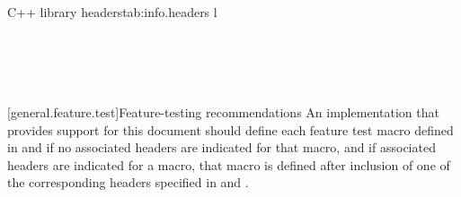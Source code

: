

\begin{floattable}{C++ library headers}{tab:info.headers}
{l}
\topline
{} \\
 \\
 \\ 
 \\
 \\

\end{floattable}

[general.feature.test]{Feature-testing recommendations }
An implementation that provides support for this document should define each feature test macro defined in  and  if no associated headers are indicated for that macro, and if associated headers are indicated for a macro, that macro is defined after inclusion of one of the corresponding headers specified in  and .




